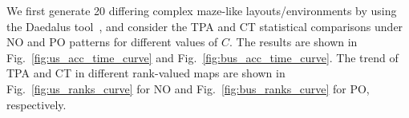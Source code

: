 

We first generate 20 differing complex maze-like layouts/environments by using the Daedalus tool~\cite{daedalus}, and consider the TPA and CT statistical comparisons under NO and PO patterns for different values of $C$. 
The results are shown in Fig.~\ref{fig:us_acc_time_curve} and Fig.~\ref{fig:bus_acc_time_curve}. 
The trend of TPA and CT in different rank-valued maps %
are shown in Fig.~\ref{fig:us_ranks_curve} for NO and Fig.~\ref{fig:bus_ranks_curve} for PO, respectively.

